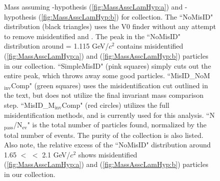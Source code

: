 \documentclass[/home/jesse/Analysis/FemtoAnalysis/AnalysisNotes/AnalysisNoteJBuxton.tex]{subfiles}
\begin{document}
\begin{figure}[h!]
  \centering
  \caption[\LamALam contamination in \Ks collection]{Mass assuming \Lam-hypothesis (\ref{fig:MassAsscLamHyp:a}) and \ALam-hypothesis (\ref{fig:MassAsscLamHyp:b}) for \Ks collection.
  The ``NoMisID" distribution (black triangles) uses the V0 finder without any attempt to remove misidentified \Lam and \ALam.
  The peak in the ``NoMisID" distribution around \minv = 1.115 GeV/$c^{2}$ contains misidentified \Lam (\ref{fig:MassAsscLamHyp:a}) and \ALam (\ref{fig:MassAsscLamHyp:b}) particles in our \Ks collection.  
  ``SimpleMisID" (pink squares) simply cuts out the entire peak, which throws away some good \Ks particles.
  ``MisID\_NoM$_{\mathrm{inv}}$Comp" (green squares) uses the misidentification cut outlined in the text, but does not utilize the final invariant mass comparison step.
  ``MisID\_M$_{\mathrm{inv}}$Comp" (red circles) utilizes the full misidentification methods, and is currently used for this analysis.
  ``N$_{\mathrm{pass}}$/N$_{\mathrm{ev}}$" is the total number of \Ks particles found, normalized by the total number of events.  The purity of the collection is also listed. 
  Also note, the relative excess of the ``NoMisID" distribution around 1.65 $<$ \minv $<$ 2.1 GeV/$c^{2}$ shows misidentified \ALam (\ref{fig:MassAsscLamHyp:a}) and \Lam (\ref{fig:MassAsscLamHyp:b}) particles in our \Ks collection.}
  \label{fig:MassAsscLamHyp}
\end{figure}
\end{document}
